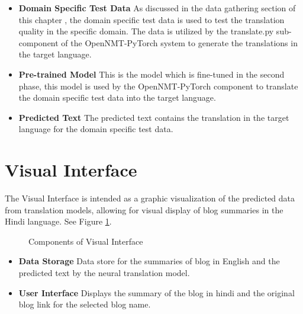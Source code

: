 \begin{itemize}
    \item \textbf{Domain Specific Test Data} As discussed in the data gathering section of this chapter , the domain specific test data is used to test the translation quality in the specific domain. The data is utilized by the translate.py sub-component of the OpenNMT-PyTorch system to generate the translations in the target language.
    \item \textbf{Pre-trained Model} This is the model which is fine-tuned in the second phase, this model is used by the OpenNMT-PyTorch component to translate the domain specific test data into the target language.
    \item \textbf{Predicted Text} The predicted text contains the translation in the target language for the domain specific test data.
\end{itemize}


\section{Visual Interface}
The Visual Interface is intended as a graphic visualization of the predicted data from translation models, allowing for visual display of blog summaries in the Hindi language. See Figure \ref{visualinterface}.

\begin{figure}[h]
\caption{Components of Visual Interface} \label{visualinterface}
\end{figure}

\begin{itemize}
    \item \textbf{Data Storage} Data store for the summaries of blog in English and the predicted text by the neural translation model.
    \item \textbf{User Interface} Displays the summary of the blog in hindi and the original blog link for the selected blog name.
\end{itemize}


